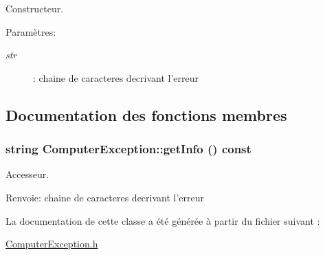 Constructeur. 

\begin{Desc}
\item[Paramètres:]
\begin{description}
\item[{\em str}]: chaine de caracteres decrivant l'erreur \end{description}
\end{Desc}


\subsection{Documentation des fonctions membres}
\hypertarget{class_computer_exception_a4c5726f929576598b204e162b6912fa}{
\subsubsection[{getInfo}]{\setlength{\rightskip}{0pt plus 5cm}string ComputerException::getInfo () const}}
\label{class_computer_exception_a4c5726f929576598b204e162b6912fa}


Accesseur. 

\begin{Desc}
\item[Renvoie:]chaine de caracteres decrivant l'erreur \end{Desc}


La documentation de cette classe a été générée à partir du fichier suivant :\begin{CompactItemize}
\item 
\hyperlink{_computer_exception_8h}{ComputerException.h}\end{CompactItemize}
